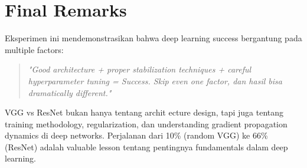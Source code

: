 \documentclass[12pt,a4paper]{report}
\begin{document}
\section{Final Remarks}

Eksperimen ini mendemonstrasikan bahwa deep learning success bergantung pada multiple factors:

\begin{quote}
    \textit{"Good architecture + proper stabilization techniques + careful hyperparameter tuning = Success. Skip even one factor, dan hasil bisa dramatically different."}
\end{quote}

VGG vs ResNet bukan hanya tentang archit ecture design, tapi juga tentang training methodology, regularization, dan understanding gradient propagation dynamics di deep networks. Perjalanan dari 10\% (random VGG) ke 66\% (ResNet) adalah valuable lesson tentang pentingnya fundamentals dalam deep learning.
\end{document}
